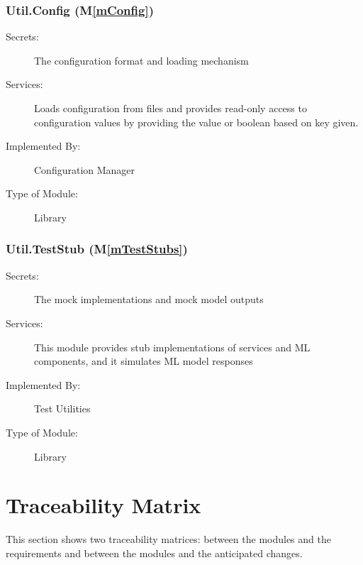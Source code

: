 \documentclass[12pt, titlepage]{article}
\newcommand{\mref}[1]{M\ref{#1}}
\begin{document}
\subsubsection{Util.Config (\mref{mConfig})}

\begin{description}
\item[Secrets:] The configuration format and loading mechanism
\item[Services:] Loads configuration from files and provides read-only access to configuration values by providing the value or boolean based on key given.
\item[Implemented By:] Configuration Manager
\item[Type of Module:] Library
\end{description}

\subsubsection{Util.TestStub (\mref{mTestStubs})}

\begin{description}
\item[Secrets:] The mock implementations and mock model outputs
\item[Services:] This module provides stub implementations of services and ML components, and it simulates ML model responses
\item[Implemented By:] Test Utilities
\item[Type of Module:] Library
\end{description}

\section{Traceability Matrix} \label{SecTM}

This section shows two traceability matrices: between the modules and the
requirements and between the modules and the anticipated changes.
\end{document}
